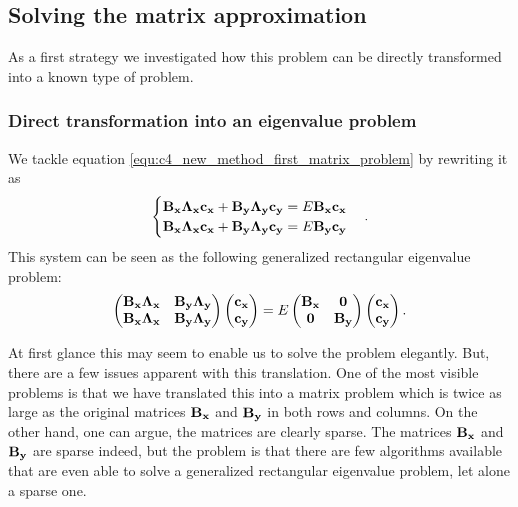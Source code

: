 \subsection{Solving the matrix approximation}

As a first strategy we investigated how this problem can be directly transformed into a known type of problem.

\subsubsection{Direct transformation into an eigenvalue problem}

We tackle equation \eqref{equ:c4_new_method_first_matrix_problem} by rewriting it as
$$
    \begin{cases}
        \vb{B_x} \vb{\Lambda_x}\vb{c_x} + \vb{B_y} \vb{\Lambda_y}\vb{c_y} = E \vb{B_x} \vb{c_x} \\
        \vb{B_x} \vb{\Lambda_x}\vb{c_x} + \vb{B_y} \vb{\Lambda_y}\vb{c_y} = E \vb{B_y} \vb{c_y} \\
    \end{cases}\text{.}
$$
This system can be seen as the following generalized rectangular eigenvalue problem:
\begin{equation}\label{equ:c4_new_method_alternative_system}
    \begin{pmatrix}
        \vb{B_x} \vb{\Lambda_x} & \vb{B_y} \vb{\Lambda_y} \\
        \vb{B_x} \vb{\Lambda_x} & \vb{B_y} \vb{\Lambda_y}
    \end{pmatrix} \begin{pmatrix}
        \vb{c_x} \\ \vb{c_y}
    \end{pmatrix} = E \begin{pmatrix}
        \vb{B_x} & \vb{0} \\ \vb{0} & \vb{B_y}
    \end{pmatrix} \begin{pmatrix}
        \vb{c_x} \\ \vb{c_y}
    \end{pmatrix}\text{.}
\end{equation}

At first glance this may seem to enable us to solve the problem elegantly. But, there are a few issues apparent with this translation. One of the most visible problems is that we have translated this into a matrix problem which is twice as large as the original matrices $\vb{B_x}$ and $\vb{B_y}$ in both rows and columns. On the other hand, one can argue, the matrices are clearly sparse. The matrices $\vb{B_x}$ and $\vb{B_y}$ are sparse indeed, but the problem is that there are few algorithms available that are even able to solve a generalized rectangular eigenvalue problem, let alone a sparse one.

